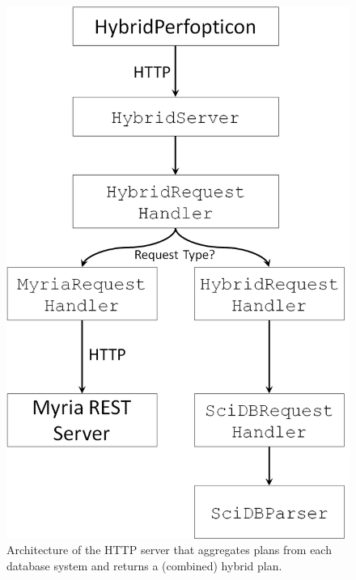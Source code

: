 \documentclass{chi2009}
\begin{document}
\begin{figure}[h]
\begin{center}
\includegraphics[scale=0.15]{hybrid-server-architecture.png}
\end{center}
\caption{Architecture of the HTTP server that aggregates plans from each database system and returns a (combined) hybrid plan.}
\label{fig:hybrid-architecture}
\end{figure}
\end{document}
